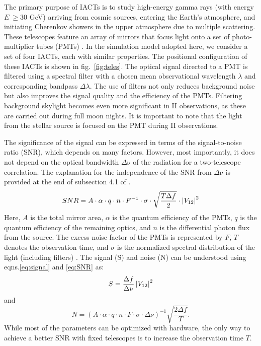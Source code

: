 The primary purpose of IACTs is to study high-energy gamma rays (with energy $E\ \geq 30$ GeV) arriving from cosmic sources, entering the Earth's atmosphere, and initiating Cherenkov showers in the upper atmosphere due to multiple scattering. These telescopes feature an array of mirrors that focus light onto a set of photo-multiplier tubes (PMTs) \cite{aleksic2016major}. In the simulation model adopted here, we consider a set of four IACTs, each with similar properties. The positional configuration of these IACTs is shown in fig.~\ref{fig:teles}. The optical signal directed to a PMT is filtered using a spectral filter with a chosen mean observational wavelength $\lambda$ and corresponding bandpass $\Delta \lambda$. The use of filters not only reduces background noise but also improves the signal quality and the efficiency of the PMTs. Filtering background skylight becomes even more significant in II observations, as these are carried out during full moon nights. It is important to note that the light from the stellar source is focused on the PMT during II observations.

The significance of the signal can be expressed in terms of the signal-to-noise ratio (SNR), which depends on many factors. However, most importantly, it does not depend on the optical bandwidth $\Delta {\mathrm {\nu}}$ of the radiation for a two-telescope correlation. The explanation for the independence of the SNR from $\Delta {\mathrm {\nu}}$ is provided at the end of subsection 4.1 of \cite{10.1093/mnras/stab2391}. 
\begin{equation}
	SNR = A \cdot \alpha \cdot q \cdot n \cdot F^{-1} \cdot \sigma \cdot \sqrt{\frac{T \Delta f}{2}} \cdot \left|V_{12}\right|^{2}
	\label{eq:SNR}
\end{equation}
Here, $A$ is the total mirror area, $\alpha$ is the quantum efficiency of the PMTs, $q$ is the quantum efficiency of the remaining optics, and $n$ is the differential photon flux from the source. The excess noise factor of the PMTs is represented by $F$, $T$ denotes the observation time, and $\sigma$ is the normalized spectral distribution of the light (including filters) \cite{acciari2020optical}. The signal (S) and noise (N) can be understood using eqns.\ref{eq:signal} and \ref{eq:SNR} as:
\begin{equation}
	S = \frac{\Delta f}{\Delta \nu} \left|V_{12}\right|^2
\end{equation}
and
\begin{equation}
	N = (A \cdot \alpha \cdot q \cdot n \cdot F \cdot \sigma \cdot \Delta \nu)^{-1}\sqrt{\frac{2 \Delta f}{T}}.
\end{equation}
While most of the parameters can be optimized with hardware, the only way to achieve a better SNR with fixed telescopes is to increase the observation time $T$.


